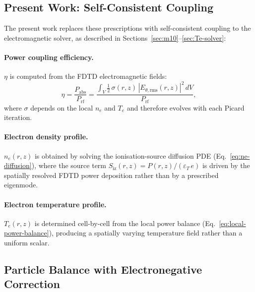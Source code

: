 \documentclass[11pt,a4paper]{report}
\newcommand{\Te}{T_e}
\begin{document}
\subsection{Present Work: Self-Consistent Coupling}

The present work replaces these prescriptions with self-consistent coupling to the electromagnetic solver, as described in Sections~\ref{sec:m10}--\ref{sec:Te-solver}:

\paragraph{Power coupling efficiency.}  $\eta$ is computed from the FDTD electromagnetic fields:
\begin{equation}
  \eta = \frac{P_\mathrm{abs}}{P_\mathrm{rf}} = \frac{\displaystyle\int_V \tfrac{1}{2}\,\sigma(r,z)\,|E_{\theta,\mathrm{rms}}(r,z)|^2\,dV}{P_\mathrm{rf}},
  \label{eq:eta-computed}
\end{equation}
where $\sigma$ depends on the local $n_e$ and $\Te$ and therefore evolves with each Picard iteration.

\paragraph{Electron density profile.}  $n_e(r,z)$ is obtained by solving the ionisation-source diffusion PDE (Eq.~\ref{eq:ne-diffusion}), where the source term $S_\mathrm{iz}(r,z) = P(r,z)/(\varepsilon_T\,e)$ is driven by the spatially resolved FDTD power deposition rather than by a prescribed eigenmode.

\paragraph{Electron temperature profile.}  $\Te(r,z)$ is determined cell-by-cell from the local power balance (Eq.~\ref{eq:local-power-balance}), producing a spatially varying temperature field rather than a uniform scalar.


\subsection{Particle Balance with Electronegative Correction}
\end{document}
